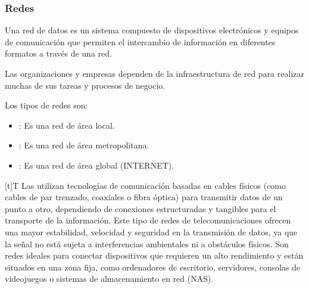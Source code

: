 \documentclass[letterpaper,10pt,spanish]{sphinxmanual}
\begin{document}
\subsubsection{Redes}
\label{\detokenize{1_guias/10informatica/G1009:redes}}
\sphinxAtStartPar
Una red de datos es un sistema compuesto de dispositivos electrónicos y equipos de comunicación que permiten el intercambio de información en diferentes formatos a través de una red.

\sphinxAtStartPar
Las organizaciones y empresas dependen de la infraestructura de red para realizar muchas de sus tareas y procesos de negocio.

\sphinxAtStartPar
Los tipos de redes son:
\begin{itemize}
\item {} 
\sphinxAtStartPar
{}: Es una red de área local.

\item {} 
\sphinxAtStartPar
{}: Es una red de área metropolitana.

\item {} 
\sphinxAtStartPar
{}: Es una red de área global (INTERNET).

\end{itemize}


\begin{savenotes}\sphinxattablestart
\sphinxthistablewithglobalstyle
\centering
\begin{tabulary}{\linewidth}[t]{T}
\sphinxtoprule
\sphinxtableatstartofbodyhook
\sphinxAtStartPar
Las  utilizan tecnologías de comunicación basadas en cables físicos (como cables de par trenzado, coaxiales o fibra óptica) para transmitir datos de un punto a otro, dependiendo de conexiones estructuradas y tangibles para el transporte de la información.  Este tipo de redes de telecomunicaciones ofrecen una mayor estabilidad, velocidad y seguridad en la transmisión de datos, ya que la señal no está sujeta a interferencias ambientales ni a obstáculos físicos. Son redes ideales para conectar dispositivos que requieren un alto rendimiento y están situados en una zona fija, como ordenadores de escritorio, servidores, consolas de videojuegos o sistemas de almacenamiento en red (NAS).
\\
\sphinxbottomrule
\end{tabulary}
\sphinxtableafterendhook\par
\sphinxattableend\end{savenotes}
\end{document}
